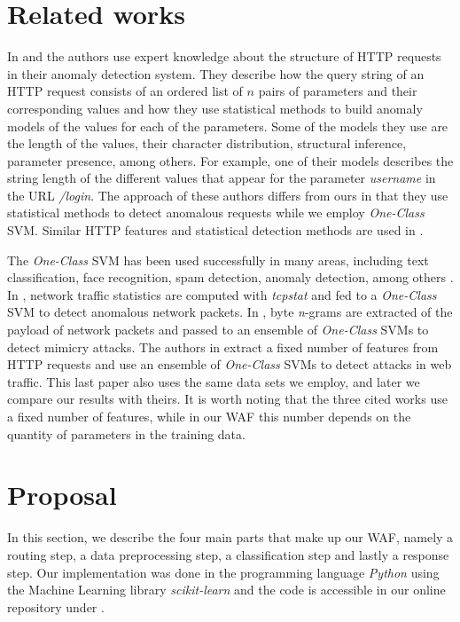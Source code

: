 \section{Related works}
\label{chap:related_works}

In \cite{kruegel2003anomaly} and \cite{kruegel2005multi} the authors use
expert knowledge about the structure of HTTP requests in their anomaly
detection system.
They describe how the query string of an HTTP request consists of an ordered
list of $n$ pairs of parameters and their corresponding values and how
they use statistical methods to build anomaly models of the values for
each of the parameters. Some of the models they use are the length of the
values, their character distribution, structural inference, parameter
presence, among others.
For example, one of their models describes the string length of the different
values that appear for the parameter \textit{username} in the URL
\textit{/login}.
The approach of these authors differs from ours in that they use statistical
methods to detect anomalous requests while we employ \textit{One-Class} SVM.
Similar HTTP features and statistical detection methods are used in
\cite{torranoGimenez2015study}.

The \textit{One-Class} SVM has been used successfully in many areas,
including text classification, face recognition, spam detection, anomaly
detection, among others \cite{khan2014one}.
In \cite{tran2004one}, network traffic statistics are computed with
\textit{tcpstat} and fed to a \textit{One-Class} SVM to detect anomalous
network packets.
In \cite{perdisci2006using}, byte \textit{n}-grams are extracted of the
payload of network packets and passed to an ensemble of \textit{One-Class}
SVMs to detect mimicry attacks.
The authors in \cite{parhizkar2015oc} extract a fixed number of features
from HTTP requests and use an ensemble of \textit{One-Class} SVMs to
detect attacks in web traffic. This last paper also uses the same data
sets we employ, and later we compare our results with theirs.
It is worth noting that the three cited works use a fixed number of
features, while in our WAF this number depends on the quantity of parameters
in the training data.


\section{Proposal}
\label{chap:proposal}

In this section, we describe the four main parts that make up our WAF,
namely a routing step, a data preprocessing step, a classification step
and lastly a response step.
Our implementation was done in the programming language \textit{Python}
using the Machine Learning library \textit{scikit-learn} and the code
is accessible in our online repository under \TheRepoUrl.



